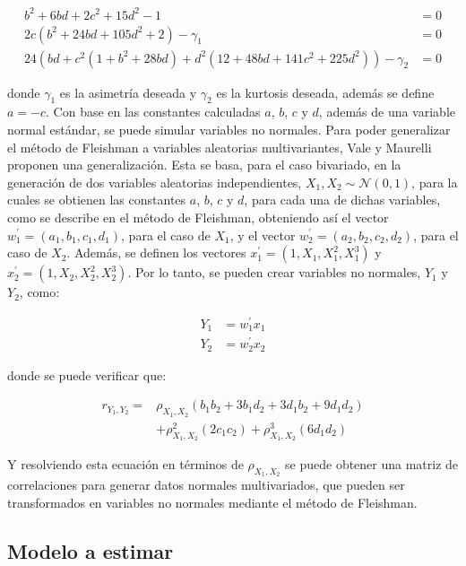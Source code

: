 \documentclass[
  english]{revcoles}
\begin{document}
\begin{align*}
  b^2 + 6bd + 2c^2 + 15d^2 -1 & = 0 \\
  2c (b^2 + 24bd + 105d^2 + 2) - \gamma_1 & = 0 \\
  24 \left(bd + c^2 (1 + b^2 + 28bd) + d^2 (12 + 48bd + 141c^2 + 225d^2) \right) - \gamma_2 & = 0
\end{align*}

donde \(\gamma_1\) es la asimetría deseada y \(\gamma_2\) es la kurtosis
deseada, además se define \(a = -c\). Con base en las constantes
calculadas \(a\), \(b\), \(c\) y \(d\), además de una variable normal
estándar, se puede simular variables no normales. Para poder generalizar
el método de Fleishman a variables aleatorias multivariantes, Vale y
Maurelli proponen una generalización. Esta se basa, para el caso
bivariado, en la generación de dos variables aleatorias independientes,
\(X_1, X_2 \sim \mathcal{N} (0,1)\), para la cuales se obtienen las
constantes \(a\), \(b\), \(c\) y \(d\), para cada una de dichas
variables, como se describe en el método de Fleishman, obteniendo así el
vector \(w^\prime_1 = (a_1, b_1, c_1, d_1)\), para el caso de \(X_1\), y
el vector \(w^\prime_2 = (a_2, b_2, c_2, d_2)\), para el caso de
\(X_2\). Además, se definen los vectores
\(x_1^\prime = (1, X_1, X_1^2, X_1^3)\) y
\(x_2^\prime = (1, X_2, X_2^2, X_2^3)\). Por lo tanto, se pueden crear
variables no normales, \(Y_1\) y \(Y_2\), como:

\begin{align*}
  Y_1 & = w_1^\prime x_1 \\
  Y_2 & = w_2^\prime x_2
\end{align*}

donde se puede verificar que:

\begin{align*}
  r_{Y_1, Y_2} = & \rho_{X_1, X_2} (b_1 b_2 + 3b_1 d_2 + 3d_1 b_2 + 9 d_1 d_2) \\
  & + \rho_{X_1, X_2}^2 (2 c_1 c_2) + \rho_{X_1, X_2}^3 (6 d_1 d_2)
\end{align*}

Y resolviendo esta ecuación en términos de \(\rho_{X_1, X_2}\) se puede
obtener una matriz de correlaciones para generar datos normales
multivariados, que pueden ser transformados en variables no normales
mediante el método de Fleishman.

\subsection{Modelo a estimar}
\end{document}
